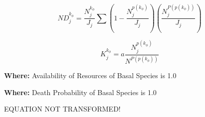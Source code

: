 \begin{equation}
ND^{k_{\phi}}_{j} = \frac{N^{k_{\phi}}_{j}}{J_{j}} \sum (1-\frac{N^{p(k_{\phi})}_{j}}{J_{j}}) (\frac{N^{P(p(k_{\phi}))}_{j}}{J_{j}})
\end{equation}

\begin{equation}
K^{k_{\phi}}_{j} = a \frac{N^{p(k_{\phi})}_{j}}{N^{P(p(k_{\phi}))}}
\end{equation}



\textbf{Where:} Availability of Resources of Basal Species is 1.0

\textbf{Where:} Death Probability of Basal Species is 1.0

%
%

EQUATION NOT TRANSFORMED!

%

